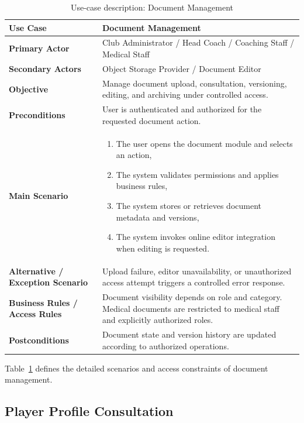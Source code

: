 \small
\renewcommand{\arraystretch}{1.05}
\begin{table}[H]
\centering
\caption{Use-case description: Document Management}
\label{tab:uc-document-management}
\begin{tabular}{|p{4.0cm}|p{9.8cm}|}
\hline
\textbf{Use Case} & Document Management \\
\hline
\textbf{Primary Actor} & Club Administrator / Head Coach / Coaching Staff / Medical Staff \\
\hline
\textbf{Secondary Actors} & Object Storage Provider / Document Editor \\
\hline
\textbf{Objective} & Manage document upload, consultation, versioning, editing, and archiving under controlled access. \\
\hline
\textbf{Preconditions} & User is authenticated and authorized for the requested document action. \\
\hline
\textbf{Main Scenario} &
\begin{enumerate}
    \item The user opens the document module and selects an action,
    \item The system validates permissions and applies business rules,
    \item The system stores or retrieves document metadata and versions,
    \item The system invokes online editor integration when editing is requested.
\end{enumerate}
\\
\hline
\textbf{Alternative / Exception Scenario} & Upload failure, editor unavailability, or unauthorized access attempt triggers a controlled error response. \\
\hline
\textbf{Business Rules / Access Rules} & Document visibility depends on role and category. Medical documents are restricted to medical staff and explicitly authorized roles. \\
\hline
\textbf{Postconditions} & Document state and version history are updated according to authorized operations. \\
\hline
\end{tabular}
\end{table}
Table~\ref{tab:uc-document-management} defines the detailed scenarios and
access constraints of document management.
\normalsize
\renewcommand{\arraystretch}{1}

\subsection{Player Profile Consultation}

